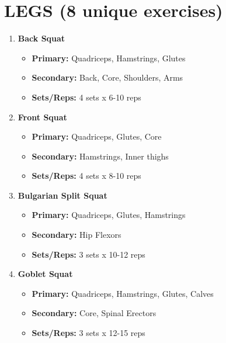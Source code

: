 \documentclass{article}
\begin{document}
\section*{LEGS (8 unique exercises)}
\begin{enumerate}[label=\arabic*., wide=0pt, leftmargin=*]
    \item \textbf{Back Squat}
        \begin{itemize}[label=\textbullet, leftmargin=*, nosep, topsep=0pt, partopsep=0pt]
            \item \textbf{Primary:} Quadriceps, Hamstrings, Glutes
            \item \textbf{Secondary:} Back, Core, Shoulders, Arms
            \item \textbf{Sets/Reps:} 4 sets x 6-10 reps
        \end{itemize}

    \item \textbf{Front Squat}
        \begin{itemize}[label=\textbullet, leftmargin=*, nosep, topsep=0pt, partopsep=0pt]
            \item \textbf{Primary:} Quadriceps, Glutes, Core
            \item \textbf{Secondary:} Hamstrings, Inner thighs
            \item \textbf{Sets/Reps:} 4 sets x 8-10 reps
        \end{itemize}

    \item \textbf{Bulgarian Split Squat}
        \begin{itemize}[label=\textbullet, leftmargin=*, nosep, topsep=0pt, partopsep=0pt]
            \item \textbf{Primary:} Quadriceps, Glutes, Hamstrings
            \item \textbf{Secondary:} Hip Flexors
            \item \textbf{Sets/Reps:} 3 sets x 10-12 reps
        \end{itemize}

    \item \textbf{Goblet Squat}
        \begin{itemize}[label=\textbullet, leftmargin=*, nosep, topsep=0pt, partopsep=0pt]
            \item \textbf{Primary:} Quadriceps, Hamstrings, Glutes, Calves
            \item \textbf{Secondary:} Core, Spinal Erectors
            \item \textbf{Sets/Reps:} 3 sets x 12-15 reps
        \end{itemize}


\end{enumerate}
\end{document}
